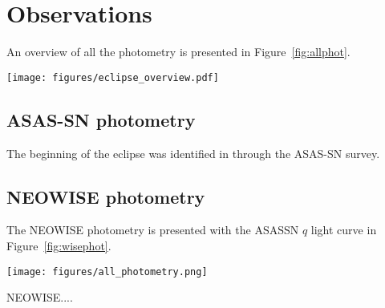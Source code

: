 \documentclass{aa}
\begin{document}
\section{Observations}\label{sec:obs}
An overview of all the photometry is presented in Figure~\ref{fig:allphot}.


\begin{figure*}
   \begin{centering}
   \texttt{[image: figures/eclipse\_overview.pdf]}
      \caption{NEOWISE $W1$ and $W2$ photometry of the star, with the WISE color in the lowest panel.
      The $NEOWISE$ color changes from colourless to very red, which fades back towards colourless over $\sim 500$ days.
              }
              \label{fig:allphot}
              \end{centering}
       \end{figure*}



\subsection{ASAS-SN photometry}

The beginning of the eclipse was identified in \citet{RizzoSmith21} through the ASAS-SN survey.
%

\subsection{NEOWISE photometry}

The NEOWISE photometry is presented with the ASASSN $q$ light curve in Figure~\ref{fig:wisephot}.

\begin{figure*}
   \begin{centering}
   \texttt{[image: figures/all\_photometry.png]}
      \caption{NEOWISE $W1$ and $W2$ photometry of the star, with the WISE color in the lowest panel.
      The $NEOWISE$ color changes from colourless to very red, which fades back towards colourless over $\sim 500$ days.
              }
              \label{fig:wisephot}
              \end{centering}
       \end{figure*}




NEOWISE....

\end{document}
